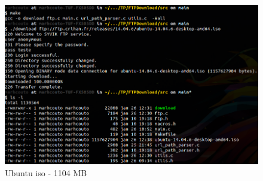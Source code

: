 \begin{figure}[!h]
\centering
  \includegraphics[width=.6\linewidth]{img/Download2.png}
  \caption{Ubuntu iso - 1104 MB}
\end{figure}

